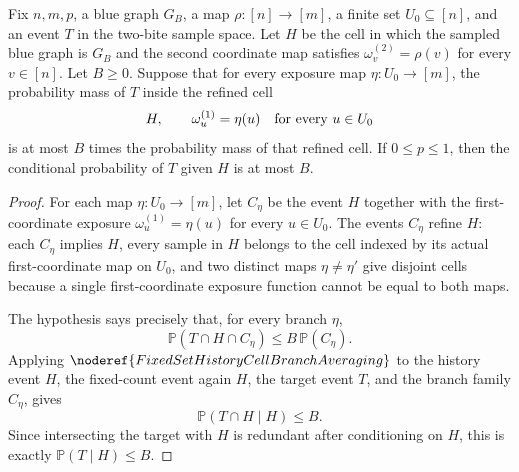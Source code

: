 \begin{lemma}
Fix \(n,m,p\), a blue graph \(G_B\), a map \(\rho:[n]\to[m]\), a finite set \(U_0\subseteq [n]\), and an event \(T\) in the two-bite sample space.  Let \(H\) be the cell in which the sampled blue graph is \(G_B\) and the second coordinate map satisfies \(\omega_v^{(2)}=\rho(v)\) for every \(v\in[n]\).  Let \(B\ge 0\).  Suppose that for every exposure map \(\eta:U_0\to [m]\), the probability mass of \(T\) inside the refined cell
\[
  H,\qquad
  \omega_u^{(1)}=\eta(u)\quad\hbox{for every }u\in U_0
\]
is at most \(B\) times the probability mass of that refined cell.  If \(0\le p\le 1\), then the conditional probability of \(T\) given \(H\) is at most \(B\).
\end{lemma}
\begin{proof}
For each map \(\eta:U_0\to [m]\), let \(C_\eta\) be the event \(H\) together with the first-coordinate exposure \(\omega_u^{(1)}=\eta(u)\) for every \(u\in U_0\).  The events \(C_\eta\) refine \(H\): each \(C_\eta\) implies \(H\), every sample in \(H\) belongs to the cell indexed by its actual first-coordinate map on \(U_0\), and two distinct maps \(\eta\ne\eta'\) give disjoint cells because a single first-coordinate exposure function cannot be equal to both maps.

The hypothesis says precisely that, for every branch \(\eta\),
\[
  \mathbb P(T\cap H\cap C_\eta)\le B\,\mathbb P(C_\eta).
\]
Applying \(\noderef{FixedSetHistoryCellBranchAveraging}\) to the history event \(H\), the fixed-count event again \(H\), the target event \(T\), and the branch family \(C_\eta\), gives
\[
  \mathbb P(T\cap H\mid H)\le B.
\]
Since intersecting the target with \(H\) is redundant after conditioning on \(H\), this is exactly \(\mathbb P(T\mid H)\le B\).
\end{proof}
